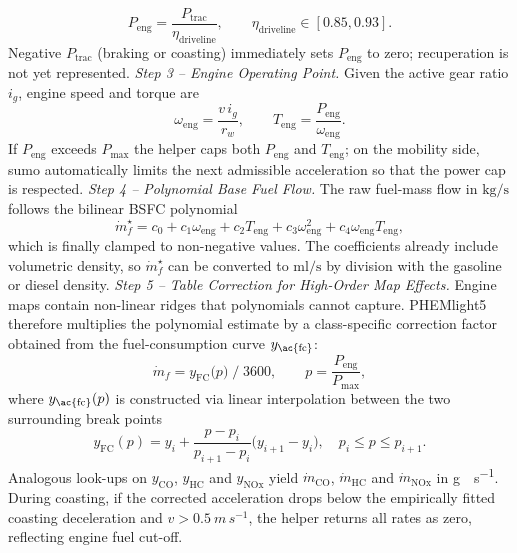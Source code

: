 \begin{equation}
  P_{\mathrm{eng}}=\frac{P_{\mathrm{trac}}}{\eta_{\mathrm{driveline}}},\qquad
  \eta_{\mathrm{driveline}}\in[0.85,0.93].
\end{equation}
Negative $P_{\mathrm{trac}}$ (braking or coasting) immediately sets $P_{\mathrm{eng}}$ to zero; recuperation is not yet represented.
\mynewline
\textit{Step 3 – Engine Operating Point.}  
Given the active gear ratio $i_{g}$, engine speed and torque are
\begin{equation}
    \omega_{\mathrm{eng}}=\frac{v\,i_{g}}{r_{w}},\qquad
    T_{\mathrm{eng}}=\frac{P_{\mathrm{eng}}}{\omega_{\mathrm{eng}}}.
\end{equation}
If $P_{\mathrm{eng}}$ exceeds $P_{\max}$ the helper caps both $P_{\mathrm{eng}}$ and $T_{\mathrm{eng}}$; on the mobility side, \ac{sumo} automatically limits the next admissible acceleration so that the power cap is respected.
\mynewline
\textit{Step 4 – Polynomial Base Fuel Flow.}  
The raw fuel-mass flow in $\unit{\kilo\gram\per\second}$ follows the bilinear BSFC polynomial
\begin{equation}
    \dot m_{f}^{\star}=c_{0}+c_{1}\omega_{\mathrm{eng}}
    +c_{2}T_{\mathrm{eng}}
    +c_{3}\omega_{\mathrm{eng}}^{2}
    +c_{4}\omega_{\mathrm{eng}}T_{\mathrm{eng}},
\end{equation}
which is finally clamped to non-negative values. The coefficients already include volumetric density, so $\dot m_{f}^{\star}$ can be converted to $\unit{\milli\litre\per\second}$ by division with the gasoline or diesel density.
\mynewline
\textit{Step 5 – Table Correction for High-Order Map Effects.}  
Engine maps contain non-linear ridges that polynomials cannot capture. PHEMlight5 therefore multiplies the polynomial estimate by a class-specific correction factor obtained from the fuel-consumption curve $y_{\mathrm{\ac{fc}}}$:
\begin{equation}
    \dot m_{f}=
    y_{\mathrm{FC}}\!\bigl(p\bigr)\;/\;3600,
    \qquad p=\frac{P_{\mathrm{eng}}}{P_{\max}},
\end{equation}
where $y_{\mathrm{\ac{fc}}}(p)$ is constructed via linear interpolation between the two surrounding break points
\[
  y_{\mathrm{FC}}(p)=
  y_{i}+\frac{p-p_{i}}{p_{i+1}-p_{i}}\bigl(y_{i+1}-y_{i}\bigr),
  \quad p_{i}\le p\le p_{i+1}.
\]
Analogous look-ups on $y_{\mathrm{CO}}$, $y_{\mathrm{HC}}$ and $y_{\mathrm{NOx}}$ yield \(\dot m_{\mathrm{CO}}\), \(\dot m_{\mathrm{HC}}\) and \(\dot m_{\mathrm{NOx}}\) in \si{\gram\;s^{-1}}.  During coasting, if the corrected acceleration drops below the empirically fitted coasting deceleration and \(v>\SI{0.5}{m\,s^{-1}}\), the helper returns all rates as zero, reflecting engine fuel cut-off.
